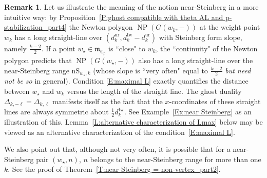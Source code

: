 \documentclass[12pt]{amsart}
\theoremstyle{definition}
\newtheorem{remark}[subsection]{Remark}
\numberwithin{equation}{subsection}
\def\gothm{\mathfrak{m}}
\def\CC{\mathbb{C}}
\DeclareMathOperator{\NP}{NP}
\newcommand{\Iw}{\mathrm{Iw}}
\newcommand{\unr}{\mathrm{ur}}
\newcommand{\nS}{\mathrm{nS}}
\begin{document}
\begin{remark}
\label{R:near-Steinberg explained}
Let us illustrate the meaning of the notion near-Steinberg in a more intuitive way: by Proposition~\ref{P:ghost compatible with theta AL and p-stabilization_part4} the Newton polygon $\NP(G(w_k,-))$ at the weight point $w_k$ has a long straight-line over $(d_{k}^\unr, d_{k}^\Iw - d_{k}^\unr)$ with Steinberg form slope, namely $\frac{k-2}2$.  If a point $w_\star \in \gothm_{\CC_p}$ is ``close" to $w_k$, the ``continuity" of the Newton polygon predicts that $\NP(G(w_\star, -))$ also has a long straight-line over the near-Steinberg range $\nS_{w_\star, k}$ (whose slope is ``very often" equal to $\frac{k-2}2$ \emph{but need not be so} in general). Condition \eqref{E:maximal L} exactly quantifies the distance between $w_\star$ and $w_k$ versus the length of the straight line. The ghost duality $\Delta_{k,-\ell} = \Delta_{k,\ell}$ manifests itself as the fact that the $x$-coordinates of these straight lines are always symmetric about $\frac 12d_k^\Iw$. See Example~\ref{Ex:near Steinberg} as an illustration of this. 
Lemma~\ref{L:alternative characterization of Lmax} below may be viewed as an alternative characterization of the condition~\eqref{E:maximal L}.

We also point out that, although not very often, it is possible that for a near-Steinberg pair $(w_\star, n)$,  $n$ belongs to the near-Steinberg range for more than one $k$. See the proof of Theorem~\ref{T:near Steinberg = non-vertex_part2}.
\end{remark}
\end{document}

